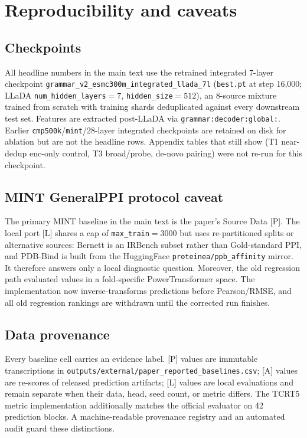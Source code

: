\section{Reproducibility and caveats}
\label{sec:appendix}

\subsection{Checkpoints}
All headline \OursCkpt{} numbers in the main text use the retrained integrated
7-layer checkpoint
\texttt{grammar\_v2\_esmc300m\_integrated\_llada\_7l}
(\texttt{best.pt} at step 16{,}000; LLaDA \texttt{num\_hidden\_layers}${=}7$,
\texttt{hidden\_size}${=}512$), an 8-source mixture trained from scratch with
training shards deduplicated against every downstream test set. Features are
extracted post-LLaDA via \texttt{grammar:decoder:global:}. Earlier
\texttt{cmp500k}/\texttt{mint}/28-layer integrated checkpoints are retained
on disk for ablation but are not the headline rows. Appendix tables that still
show \tbd{} (T1 near-dedup enc-only control, T3 broad/probe, de-novo pairing)
were not re-run for this checkpoint.

\subsection{MINT GeneralPPI protocol caveat}
\label{sec:mint-caveat}
The primary MINT baseline in the main text is the paper's Source Data [P]. The
local port [L] shares a cap of \texttt{max\_train}${=}3000$ but uses
re-partitioned splits or alternative sources: Bernett is an IRBench subset
rather than Gold-standard PPI, and PDB-Bind is built from the HuggingFace
\texttt{proteinea/ppb\_affinity} mirror. It therefore answers only a local
diagnostic question. Moreover, the old regression path evaluated values in a
fold-specific PowerTransformer space. The implementation now inverse-transforms
predictions before Pearson/RMSE, and all old regression rankings are withdrawn
until the corrected run finishes.

\subsection{Data provenance}
Every baseline cell carries an evidence label. [P] values are immutable
transcriptions in \texttt{outputs/external/paper\_reported\_baselines.csv}; [A]
values are re-scores of released prediction artifacts; [L] values are local
evaluations and remain separate when their data, head, seed count, or metric
differs. The TCRT5 metric implementation additionally matches the official
evaluator on 42 prediction blocks. A machine-readable provenance registry and
an automated audit guard these distinctions.

